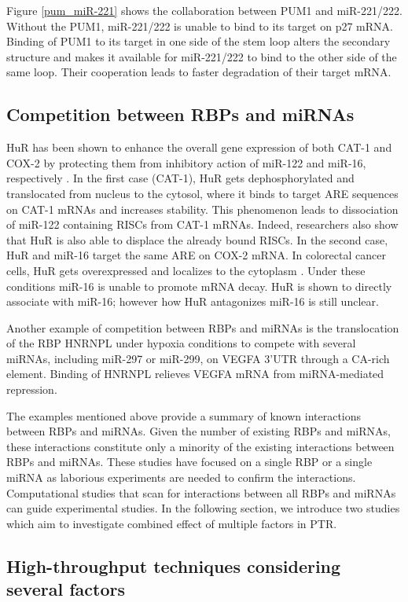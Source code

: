 Figure \ref{pum_miR-221} shows the collaboration between PUM1 and miR-221/222. Without the PUM1, miR-221/222 is unable to bind to its target on p27 mRNA. Binding of PUM1 to its target in one side of the stem loop alters the secondary structure and makes it available for miR-221/222 to bind to the other side of the same loop. Their cooperation leads to faster degradation of their target mRNA.

\subsection{Competition between RBPs and miRNAs}

HuR has been shown to enhance the overall gene expression of both CAT-1 and COX-2 by protecting them from inhibitory action of miR-122 and miR-16, respectively \cite{bhattacharyya_2006, young_2012}. In the first case (CAT-1), HuR gets dephosphorylated and translocated from nucleus to the cytosol, where it binds to target ARE sequences on CAT-1 mRNAs and increases stability. This phenomenon leads to dissociation of miR-122 containing RISCs from CAT-1 mRNAs. Indeed, researchers also show that HuR is also able to displace the already bound RISCs. In the second case, HuR and miR-16 target the same ARE on COX-2 mRNA. In colorectal cancer cells, HuR gets overexpressed and localizes to the cytoplasm \cite{young_2012}. Under these conditions miR-16 is unable to promote mRNA decay. HuR is shown to directly associate with miR-16; however how HuR antagonizes miR-16 is still unclear. 

Another example of competition between RBPs and miRNAs is the translocation of the RBP HNRNPL under hypoxia conditions to compete with several miRNAs, including miR-297 or miR-299, on VEGFA 3’UTR through a CA-rich element. Binding of HNRNPL relieves VEGFA mRNA from miRNA-mediated repression.

The examples mentioned above provide a summary of known interactions between RBPs and miRNAs. Given the number of existing RBPs and miRNAs, these interactions constitute only a minority of the existing interactions between RBPs and miRNAs. These studies have focused on a single RBP or a single miRNA as laborious experiments are needed to confirm the interactions. Computational studies that scan for interactions between all RBPs and miRNAs can guide experimental studies. In the following section, we introduce two studies which aim to investigate combined effect of multiple factors in PTR.

\subsection{High-throughput techniques considering several factors}

